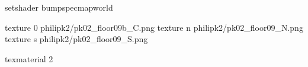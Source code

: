 setshader bumpspecmapworld

texture 0 philipk2/pk02_floor09b_C.png
texture n philipk2/pk02_floor09_N.png
texture s philipk2/pk02_floor09_S.png

texmaterial 2
